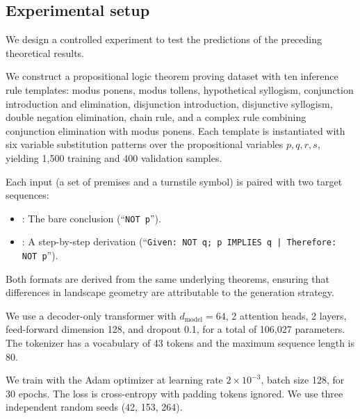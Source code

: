 \subsection{Experimental setup}\label{subsec:setup}

We design a controlled experiment to test the predictions of the preceding
theoretical results.

 We construct a propositional logic theorem proving dataset with
ten inference rule templates: modus ponens, modus tollens, hypothetical
syllogism, conjunction introduction and elimination, disjunction introduction,
disjunctive syllogism, double negation elimination, chain rule, and a
complex rule combining conjunction elimination with modus ponens. Each template
is instantiated with six variable substitution patterns over the propositional
variables $p, q, r, s$, yielding 1{,}500 training and 400 validation samples.

 Each input (a set of premises and a turnstile symbol) is
paired with two target sequences:
\begin{itemize}[leftmargin=*,itemsep=0pt]
  \item \Direct: The bare conclusion (\eg ``\texttt{NOT p}'').
  \item \CoT: A step-by-step derivation (\eg ``\texttt{Given: NOT q; p IMPLIES
    q | Therefore: NOT p}'').
\end{itemize}
Both formats are derived from the same underlying theorems, ensuring that
differences in landscape geometry are attributable to the generation strategy.

 We use a decoder-only transformer with $d_{\mathrm{model}}
= 64$, 2 attention heads, 2 layers, feed-forward dimension 128, and dropout
0.1, for a total of 106{,}027 parameters. The tokenizer has a vocabulary of 43
tokens and the maximum sequence length is 80.

 We train with the Adam optimizer at learning rate $2 \times
10^{-3}$, batch size 128, for 30 epochs. The loss is cross-entropy with padding
tokens ignored. We use three independent random seeds (42, 153, 264).

